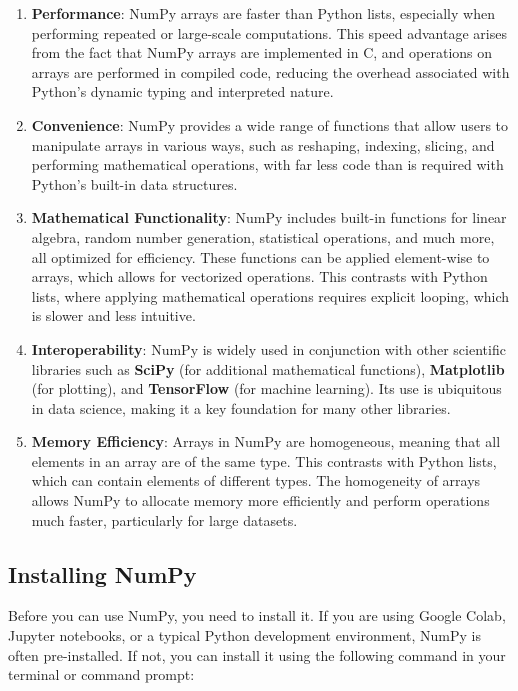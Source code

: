 \documentclass[
  letterpaper,
  DIV=11,
  numbers=noendperiod]{scrreprt}
\begin{document}
\begin{enumerate}
\def\labelenumi{\arabic{enumi}.}
\item
  \textbf{Performance}: NumPy arrays are faster than Python lists,
  especially when performing repeated or large-scale computations. This
  speed advantage arises from the fact that NumPy arrays are implemented
  in C, and operations on arrays are performed in compiled code,
  reducing the overhead associated with Python's dynamic typing and
  interpreted nature.
\item
  \textbf{Convenience}: NumPy provides a wide range of functions that
  allow users to manipulate arrays in various ways, such as reshaping,
  indexing, slicing, and performing mathematical operations, with far
  less code than is required with Python's built-in data structures.
\item
  \textbf{Mathematical Functionality}: NumPy includes built-in functions
  for linear algebra, random number generation, statistical operations,
  and much more, all optimized for efficiency. These functions can be
  applied element-wise to arrays, which allows for vectorized
  operations. This contrasts with Python lists, where applying
  mathematical operations requires explicit looping, which is slower and
  less intuitive.
\item
  \textbf{Interoperability}: NumPy is widely used in conjunction with
  other scientific libraries such as \textbf{SciPy} (for additional
  mathematical functions), \textbf{Matplotlib} (for plotting), and
  \textbf{TensorFlow} (for machine learning). Its use is ubiquitous in
  data science, making it a key foundation for many other libraries.
\item
  \textbf{Memory Efficiency}: Arrays in NumPy are homogeneous, meaning
  that all elements in an array are of the same type. This contrasts
  with Python lists, which can contain elements of different types. The
  homogeneity of arrays allows NumPy to allocate memory more efficiently
  and perform operations much faster, particularly for large datasets.
\end{enumerate}

\hypertarget{installing-numpy}{%
\subsection{Installing NumPy}\label{installing-numpy}}

Before you can use NumPy, you need to install it. If you are using
Google Colab, Jupyter notebooks, or a typical Python development
environment, NumPy is often pre-installed. If not, you can install it
using the following command in your terminal or command prompt:
\end{document}
